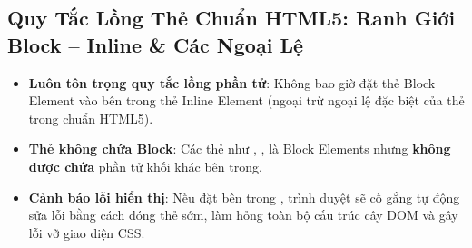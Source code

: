 \subsection{Quy Tắc Lồng Thẻ Chuẩn HTML5: Ranh Giới Block -- Inline \& Các Ngoại Lệ}
\label{subsec:nesting_rules_block_inline}

\begin{warnBox}
\begin{itemize}[leftmargin=1.5em, itemsep=3pt, parsep=0pt]
    \item \textbf{Luôn tôn trọng quy tắc lồng phần tử}: Không bao giờ đặt thẻ Block Element vào bên trong thẻ Inline Element (ngoại trừ ngoại lệ đặc biệt của thẻ  trong chuẩn HTML5).
    \item \textbf{Thẻ không chứa Block}: Các thẻ như , ,  là Block Elements nhưng \textbf{không được chứa} phần tử khối khác bên trong.
    \item \textbf{Cảnh báo lỗi hiển thị}: Nếu đặt  bên trong , trình duyệt sẽ cố gắng tự động sửa lỗi bằng cách đóng thẻ  sớm, làm hỏng toàn bộ cấu trúc cây DOM và gây lỗi vỡ giao diện CSS.
\end{itemize}
\end{warnBox}


